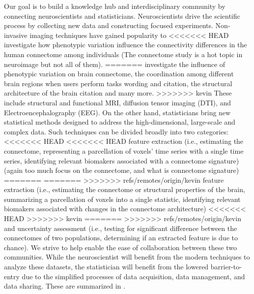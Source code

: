 \documentclass{nature}
\begin{document}
Our goal is to %
build a knowledge hub and interdisciplinary community by connecting
neuroscientists and statisticians.  Neuroscientists
drive the scientific process by collecting new data and constructing focused
experiments. Non-invasive imaging techniques have gained popularity to
<<<<<<< HEAD
investigate how phenotypic variation
influence the connectivity differences in the human
connectome among individuals\cite{sporns2005human,sporns2011human} 
{\color{red}(The connectome study is a hot topic in neuroimage but not all of them)}. 
=======
investigate the influence of phenotypic variation
on brain connectome\cite{sporns2005human,sporns2011human},
the coordination among different brain regions when users perform
tasks {\color{red}wording and citation},
the structural architecture of the brain {\color{red}citation} and many more. 
>>>>>>> kevin
These include structural and functional MRI,
diffusion tensor imaging (DTI), and Electroencephalography
(EEG).
On the other hand, statisticians bring new statistical methods
designed to address the high-dimensional, large-scale and complex
data. Such techniques can be divided broadly into
two categories:
<<<<<<< HEAD
<<<<<<< HEAD
feature extraction (i.e., estimating the connectome, representing
a parcellation of voxels' time series with a single time series,
identifying relevant biomakers associated with a connectome signature)
{\color{red}(again too much focus on the connectome, and what is connectome signature)}
=======
=======
>>>>>>> refs/remotes/origin/kevin
feature extraction (i.e., estimating the connectome or structural 
properties of the brain, summarizing
a parcellation of voxels into a single statistic,
identifying relevant biomakers associated with changes in the connectome architecture)
<<<<<<< HEAD
>>>>>>> kevin
=======
>>>>>>> refs/remotes/origin/kevin
and uncertainty assessment (i.e., testing for significant difference
between the connectomes of two populations, determining if 
an extracted feature is due to chance).
We strive to help enable the ease of collaboration between these two communities.
While the neuroscientist will benefit from the modern techniques to
analyze these datasets, the statistician
will benefit from the lowered barrier-to-entry
due to the  simplified processes of data acquisition, data management, and data
sharing. These are summarized in .
\end{document}

